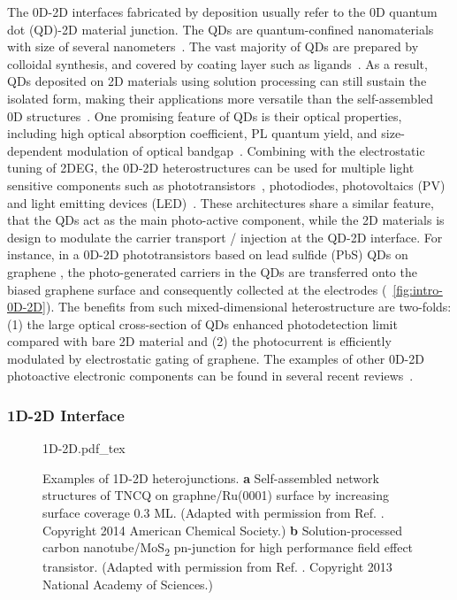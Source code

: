 The 0D-2D interfaces fabricated by deposition usually refer to the 0D
quantum dot (QD)-2D material junction. The QDs are
quantum-confined nano\-materials with size of several
nano\-meters~\autocite{Sargent_2013_colloidal_book}.
%
The vast majority of QDs are prepared by colloidal synthesis, and
covered by coating layer such as ligands~\autocite{Kim_2013_QD_rev}.
%
As a result, QDs deposited on 2D materials using solution processing
can still sustain the isolated form, making their applications more
versatile than the self-assembled 0D
structures~\autocite{Jariwala_2016_mixed_vdw_het}.
%
One promising feature of QDs is their optical properties, including
high optical absorption coefficient, PL quantum yield, and
size-dependent modulation of optical
bandgap~\autocite{Xia_2014_2D_nanophoto_rev}.
%
Combining with the electrostatic tuning of 2DEG, the 0D-2D
heterostructures can be used for multiple light sensitive components
such as
photo\-transistors~\autocite{Kufer_2014_QD-mos2,Konstantatos_2012_QD_gr_trans},
photo\-diodes\autocite{Kufer_2014_QD-mos2}, photo\-voltaics
(PV)~\autocite{Guo_2010_gr_QD_PV,Wang_2016_QD_PV} and light emitting
devices (LED)~\autocite{Son_2012_ZnO-Gr-QD}.
%
These architectures share a similar feature, that the QDs act as the
main photo-active component, while the 2D materials is design to
modulate the carrier transport / injection at the QD-2D interface.
%
For instance, in a 0D-2D photo\-transistors based on lead sulfide
(PbS) QDs on graphene \autocite{Konstantatos_2012_QD_gr_trans}, the
photo-generated carriers in the QDs are transferred onto the biased
graphene surface and consequently collected at the electrodes
(~\autoref{fig:intro-0D-2D}). The benefits from such
mixed-dimensional heterostructure are two-folds: (1) the large optical
cross-section of QDs enhanced photo\-detection limit compared with
bare 2D material and (2) the photo\-current is efficiently modulated
by electrostatic gating of graphene.
%
The examples of other 0D-2D photo\-active electronic components can be
found in several recent
reviews~\autocite{Jariwala_2016_mixed_vdw_het,Kufer_2016_QD_FET_rev}.


\subsubsection{1D-2D Interface}
\label{sec:orgeadf57e}

\begin{figure}[h]
  \centering
  {1D-2D.pdf_tex}
  \caption{\label{fig:intro-1D-2D}%
    Examples of 1D-2D hetero\-junctions. \textbf{a} Self-assembled
    network structures of TNCQ on graphne/Ru(0001) surface by
    increasing surface coverage 0.3 ML. (Adapted with permission from
    Ref. \cite{Maccariello_2014_TCNQ_gr_Ru}. Copyright 2014 American
    Chemical Society.) \textbf{b} Solution-processed carbon
    nano\-tube/MoS\textsubscript{2} pn-junction for high performance
    field effect transistor. (Adapted with permission from
    Ref. \cite{Jariwala_2013_CNT-mos2}. Copyright 2013 National
    Academy of Sciences.)}
\end{figure}

